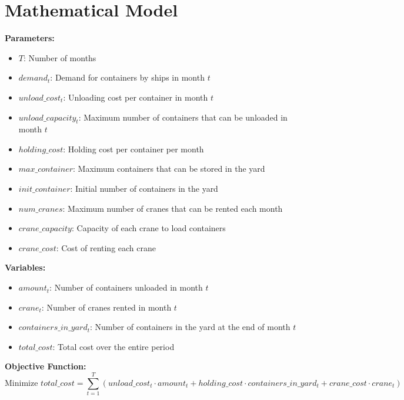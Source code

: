 \documentclass{article}
\begin{document}
\section*{Mathematical Model}

\textbf{Parameters:}
\begin{itemize}
    \item $T$: Number of months
    \item $demand_t$: Demand for containers by ships in month $t$
    \item $unload\_cost_t$: Unloading cost per container in month $t$
    \item $unload\_capacity_t$: Maximum number of containers that can be unloaded in month $t$
    \item $holding\_cost$: Holding cost per container per month
    \item $max\_container$: Maximum containers that can be stored in the yard
    \item $init\_container$: Initial number of containers in the yard
    \item $num\_cranes$: Maximum number of cranes that can be rented each month
    \item $crane\_capacity$: Capacity of each crane to load containers
    \item $crane\_cost$: Cost of renting each crane
\end{itemize}

\textbf{Variables:}
\begin{itemize}
    \item $amount_t$: Number of containers unloaded in month $t$
    \item $crane_t$: Number of cranes rented in month $t$
    \item $containers\_in\_yard_t$: Number of containers in the yard at the end of month $t$
    \item $total\_cost$: Total cost over the entire period
\end{itemize}

\textbf{Objective Function:}
\[
\text{Minimize } total\_cost = \sum_{t=1}^{T} (unload\_cost_t \cdot amount_t + holding\_cost \cdot containers\_in\_yard_t + crane\_cost \cdot crane_t)
\]
\end{document}
